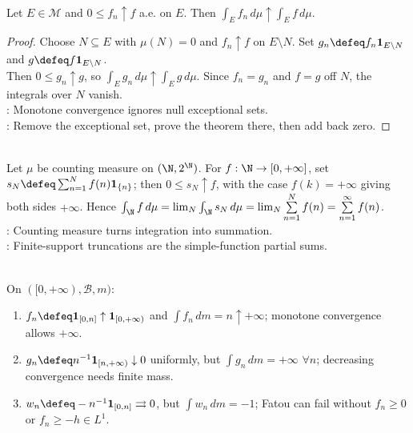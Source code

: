 \begin{corollary} \label{cor:monotone-convergence-ae} \\
Let $E\in\mathcal{M}$ and $0\leq f_n\uparrow f$ a.e. on $E$. Then $\int_Ef_n\,d\mu\uparrow\int_Ef\,d\mu$.
\begin{proof}
Choose $N\subseteq E$ with $\mu(N)=0$ and $f_n\uparrow f$ on $E\setminus N$. Set $g_n\defeq f_n\mathbf{1}_{E\setminus N}$ and $g\defeq f\mathbf{1}_{E\setminus N}$.\\
Then $0\leq g_n\uparrow g$, so $\int_Eg_n\,d\mu\uparrow\int_Eg\,d\mu$. Since $f_n=g_n$ and $f=g$ off $N$, the integrals over $N$ vanish.\\
: Monotone convergence ignores null exceptional sets.\\
: Remove the exceptional set, prove the theorem there, then add back zero.
\end{proof}
\end{corollary}

\begin{example} \label{ex:counting-measure-integral-is-series} \\
Let $\mu$ be counting measure on $(\N,2^\N)$. For $f:\N\to[0,+\infty]$, set $s_N\defeq\sum_{n=1}^{N}f(n)\mathbf{1}_{\{n\}}$; then $0\leq s_N\uparrow f$, with the case $f(k)=+\infty$ giving both sides $+\infty$. Hence $\int_{\N} f\,d\mu=\lim_N\int_{\N}s_N\,d\mu =\lim_N\sum\limits_{n=1}^{N}f(n) =\sum\limits_{n=1}^{\infty}f(n)$.\\
: Counting measure turns integration into summation.\\
: Finite-support truncations are the simple-function partial sums.
\end{example}

\begin{example} \label{ex:monotone-fatou-boundary-tests} \\
On $([0,+\infty),\mathcal{B},m)$:
\begin{enumerate}[label=(\roman*)]
\setlength{\itemsep}{0pt}
\item $f_n\defeq\mathbf{1}_{[0,n]}\uparrow\mathbf{1}_{[0,+\infty)}$ and $\int f_n\,dm=n\uparrow+\infty$; monotone convergence allows $+\infty$.
\item $g_n\defeq n^{-1}\mathbf{1}_{[n,+\infty)}\downarrow0$ uniformly, but $\int g_n\,dm=+\infty$ $\forall n$; decreasing convergence needs finite mass.
\item $w_n\defeq-n^{-1}\mathbf{1}_{[0,n]}\rightrightarrows0$, but $\int w_n\,dm=-1$; Fatou can fail without $f_n\geq0$ or $f_n\geq-h\in L^1$.
\end{enumerate}
\end{example}

